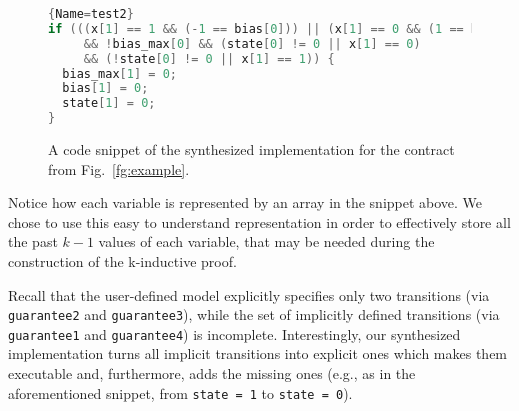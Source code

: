 \begin{figure}[t!]
\vspace{-2em}
\begin{minipage}{2.0\textwidth}
\begin{lstlisting}[basicstyle=\scriptsize,language=C]{Name=test2}
if (((x[1] == 1 && (-1 == bias[0])) || (x[1] == 0 && (1 == bias[0])))
     && !bias_max[0] && (state[0] != 0 || x[1] == 0)
     && (!state[0] != 0 || x[1] == 1)) {
  bias_max[1] = 0;
  bias[1] = 0;
  state[1] = 0;
}
\end{lstlisting}%
\end{minipage}
\vspace{-1em}
\caption{A code snippet of the synthesized implementation for the contract from Fig.~\ref{fg:example}.}
\vspace{-.5em}
\label{fg:snippet}
\end{figure}%

Notice how each variable is represented by an array in the snippet above.
We chose to use this easy to understand representation in order to effectively
store all the past $k-1$ values of each variable, that may be needed during the
construction of the k-inductive proof.

Recall that the user-defined model explicitly specifies only two transitions
(via \texttt{guarantee2} and \texttt{guarantee3}), while the set of implicitly defined transitions (via \texttt{guarantee1} and \texttt{guarantee4}) is incomplete.
Interestingly, our synthesized implementation turns all implicit transitions
into explicit ones which makes them executable and, furthermore, adds the
missing ones (e.g., as in the aforementioned snippet, from \texttt{state = 1} to \texttt{state = 0}).
